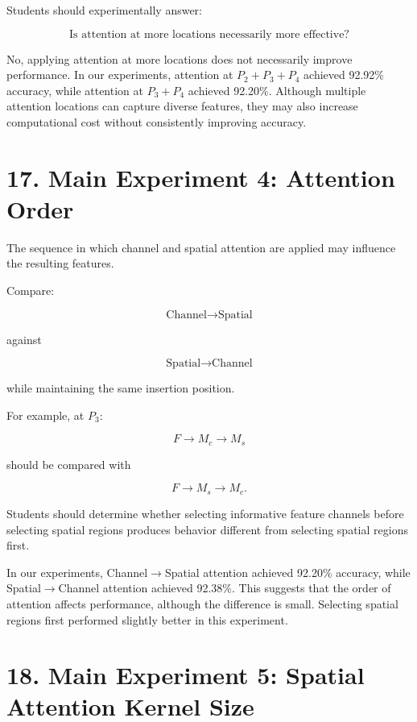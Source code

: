 \documentclass[10pt]{article}
\begin{document}
Students should experimentally answer:

\[
\boxed{
\text{Is attention at more locations necessarily more effective?}
}
\]

No, applying attention at more locations does not necessarily improve
performance. In our experiments, attention at $P_2+P_3+P_4$ achieved
92.92\% accuracy, while attention at $P_3+P_4$ achieved 92.20\%.
Although multiple attention locations can capture diverse features, they may
also increase computational cost without consistently improving accuracy.

\section*{17. Main Experiment 4: Attention Order}

The sequence in which channel and spatial attention are applied may influence
the resulting features.

Compare:

\[
\boxed{
\text{Channel}
\rightarrow
\text{Spatial}
}
\]

against

\[
\boxed{
\text{Spatial}
\rightarrow
\text{Channel}
}
\]

while maintaining the same insertion position.

For example, at $P_3$:

\[
F
\rightarrow
M_c
\rightarrow
M_s
\]

should be compared with

\[
F
\rightarrow
M_s
\rightarrow
M_c.
\]

Students should determine whether selecting informative feature channels
before selecting spatial regions produces behavior different from selecting
spatial regions first.

In our experiments, Channel$\rightarrow$Spatial attention achieved 92.20\%
accuracy, while Spatial$\rightarrow$Channel attention achieved 92.38\%.
This suggests that the order of attention affects performance, although the
difference is small. Selecting spatial regions first performed slightly
better in this experiment.

\section*{18. Main Experiment 5: Spatial Attention Kernel Size}
\end{document}
